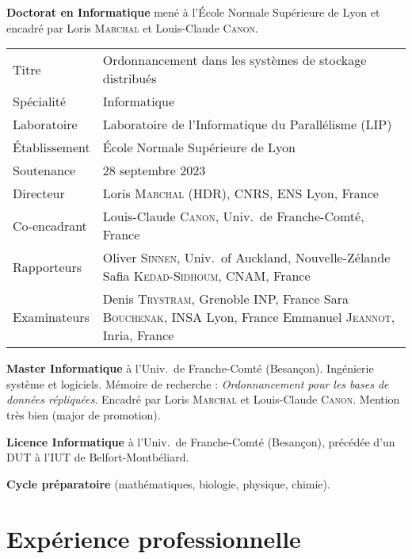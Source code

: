 \documentclass[12pt]{article}
\newcommand{\cvitem}[2]{\item[#1] #2}
\newcounter{cvitems}
\begin{document}
\begin{cvitems}
    \cvitem{2020--2023}{\textbf{Doctorat en Informatique} mené à l'École Normale Supérieure de Lyon
    et encadré par Loris \textsc{Marchal} et Louis-Claude \textsc{Canon}.

    \renewcommand{\arraystretch}{1.4}
    \begin{tabularx}{\linewidth}{@{}lX@{}}
        Titre         & Ordonnancement dans les systèmes de stockage distribués \tabularnewline
        Spécialité    & Informatique \tabularnewline
        Laboratoire   & Laboratoire de l'Informatique du Parallélisme (LIP) \tabularnewline
        Établissement & École Normale Supérieure de Lyon \tabularnewline
        Soutenance    & 28 septembre 2023 \tabularnewline
        Directeur     & Loris \textsc{Marchal} (HDR), CNRS, ENS Lyon, France \tabularnewline
        Co-encadrant  & Louis-Claude \textsc{Canon}, Univ.\ de Franche-Comté, France \tabularnewline
        Rapporteurs   & Oliver \textsc{Sinnen}, Univ.\ of Auckland, Nouvelle-Zélande \newline
                        Safia \textsc{Kedad-Sidhoum}, CNAM, France \tabularnewline
        Examinateurs  & Denis \textsc{Trystram}, Grenoble INP, France \newline
                        Sara \textsc{Bouchenak}, INSA Lyon, France \newline
                        Emmanuel \textsc{Jeannot}, Inria, France \tabularnewline
    \end{tabularx}}

    \cvitem{2018--2020}{\textbf{Master Informatique} à l'Univ.\ de Franche-Comté (Besançon).  
    Ingénierie système et logiciels.  
    Mémoire de recherche : \emph{Ordonnancement pour les bases de données répliquées}.  
    Encadré par Loris \textsc{Marchal} et Louis-Claude \textsc{Canon}.  
    Mention très bien (major de promotion).}

    \cvitem{2015--2018}{\textbf{Licence Informatique} à l'Univ.\ de Franche-Comté (Besançon),
    précédée d'un DUT à l'IUT de Belfort-Montbéliard.}

    \cvitem{2013-2015}{\textbf{Cycle préparatoire} (mathématiques, biologie, physique, chimie).}
\end{cvitems}

\section{Expérience professionnelle}
\end{document}
